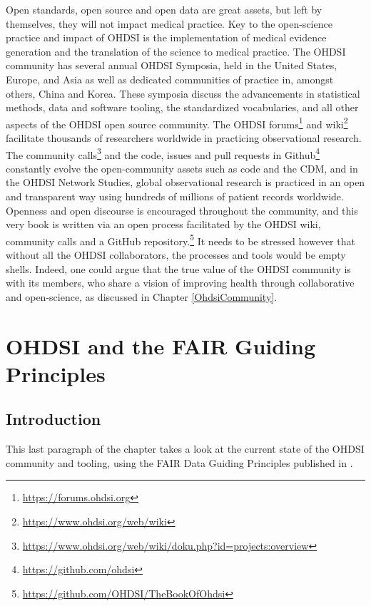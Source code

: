 \documentclass[11pt]{book}
\let\rmarkdownfootnote\footnote%
\def\footnote{\protect\rmarkdownfootnote}
\theoremstyle{definition}
\theoremstyle{definition}
\theoremstyle{definition}
\theoremstyle{remark}
\begin{document}
Open standards, open source and open data are great assets, but left by
themselves, they will not impact medical practice. Key to the
open-science practice and impact of OHDSI is the implementation of
medical evidence generation and the translation of the science to
medical practice. The OHDSI community has several annual OHDSI Symposia,
held in the United States, Europe, and Asia as well as dedicated
communities of practice in, amongst others, China and Korea. These
symposia discuss the advancements in statistical methods, data and
software tooling, the standardized vocabularies, and all other aspects
of the OHDSI open source community. The OHDSI forums\footnote{\url{https://forums.ohdsi.org}}
and wiki\footnote{\url{https://www.ohdsi.org/web/wiki}} facilitate
thousands of researchers worldwide in practicing observational research.
The community calls\footnote{\url{https://www.ohdsi.org/web/wiki/doku.php?id=projects:overview}}
and the code, issues and pull requests in Github\footnote{\url{https://github.com/ohdsi}}
constantly evolve the open-community assets such as code and the CDM,
and in the OHDSI Network Studies, global observational research is
practiced in an open and transparent way using hundreds of millions of
patient records worldwide. Openness and open discourse is encouraged
throughout the community, and this very book is written via an open
process facilitated by the OHDSI wiki, community calls and a GitHub
repository.\footnote{\url{https://github.com/OHDSI/TheBookOfOhdsi}} It
needs to be stressed however that without all the OHDSI collaborators,
the processes and tools would be empty shells. Indeed, one could argue
that the true value of the OHDSI community is with its members, who
share a vision of improving health through collaborative and
open-science, as discussed in Chapter \ref{OhdsiCommunity}.

\section{OHDSI and the FAIR Guiding
Principles}\label{ohdsi-and-the-fair-guiding-principles}


\subsection{Introduction}\label{introduction}

This last paragraph of the chapter takes a look at the current state of
the OHDSI community and tooling, using the FAIR Data Guiding Principles
published in \citet{wilkinson2016}.
\end{document}
